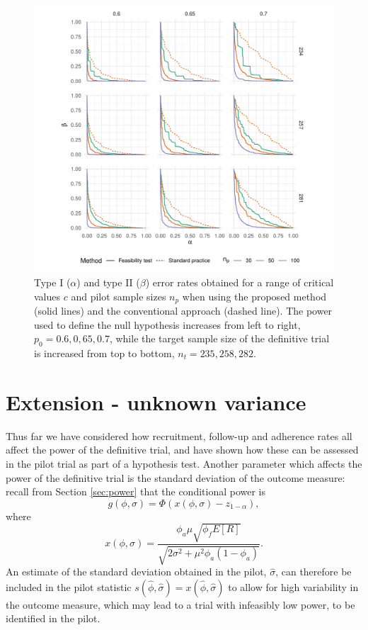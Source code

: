 \documentclass[AMA,STIX1COL]{WileyNJD-v2}
\begin{document}
\begin{figure}
\centering
\includegraphics[scale=0.8, trim={1.5cm 0 0 0},clip]{./Figures/eval.pdf}
\caption{Type I ($\alpha$) and type II ($\beta$) error rates obtained for a range of critical values $c$ and pilot sample sizes $n_p$ when using the proposed method (solid lines) and the conventional approach (dashed line). The power used to define the null hypothesis increases from left to right, $p_0 = 0.6, 0,65, 0.7$, while the target sample size of the definitive trial is increased from top to bottom, $n_t = 235, 258, 282$.}
\label{fig:eval}
\end{figure}

\section{Extension - unknown variance}\label{sec:extension}

Thus far we have considered how recruitment, follow-up and adherence rates all affect the power of the definitive trial, and have shown how these can be assessed in the pilot trial as part of a hypothesis test. Another parameter which affects the power of the definitive trial is the standard deviation of the outcome measure: recall from Section \ref{sec:power} that the conditional power is 
\begin{equation*}
g(\phi, \sigma) = \Phi \left( x(\phi, \sigma) - z_{1-\alpha} \right),
\end{equation*}
where 
$$
x(\phi, \sigma) =  \frac{ \phi_a\mu \sqrt{\phi_f E[R]} } {\sqrt{2\sigma^2 + \mu^2 \phi_a(1-\phi_a)}}.
$$
An estimate of the standard deviation obtained in the pilot, $\hat{\sigma}$, can therefore be included in the pilot statistic $s(\hat{\phi}, \hat{\sigma}) = x(\hat{\phi}, \hat{\sigma})$ to allow for high variability in the outcome measure, which may lead to a trial with infeasibly low power, to be identified in the pilot.
\end{document}
